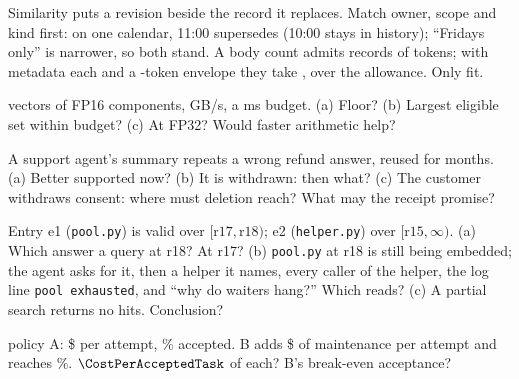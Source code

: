 \documentclass{studysheet}
\begin{document}
\begin{rightcol}
%
  {Similarity puts a revision beside the record it replaces. Match owner, scope and kind first: on one
   calendar, 11:00 supersedes (10:00 stays in history); ``Fridays only'' is narrower, so both stand.}{}
%
  {A body count admits  records of  tokens; with  metadata each and a
   -token envelope they take ,  over the allowance. Only  fit.}{}

\vspace{2pt}
\begin{qs}\raggedright
\item \assumed{}  vectors of  FP16 components,  GB/s, a
   ms budget. (a) Floor? (b) Largest eligible set within budget? (c) At FP32? Would faster
  arithmetic help?
\item A support agent's summary repeats a wrong refund answer, reused for months. (a) Better supported now? (b) It is withdrawn: then what? (c) The customer withdraws
  consent: where must deletion reach? What may the receipt promise?
\item Entry e1 (\texttt{pool.py}) is valid over $[\text{r17}, \text{r18})$; e2 (\texttt{helper.py}) over
  $[\text{r15}, \infty)$. (a) Which answer a query at r18? At r17? (b) \texttt{pool.py} at r18 is still being
  embedded; the agent asks for it, then a helper it names, every caller of the helper, the log line
  \texttt{pool exhausted}, and ``why do waiters hang?'' Which reads? (c) A partial search returns no hits. Conclusion?
\item \assumed{} policy A: \$ per attempt, \% accepted. B adds \$ of
  maintenance per attempt and reaches \%. $\CostPerAcceptedTask$ of each? B's break-even
  acceptance?
\end{qs}
\end{rightcol}
\end{document}
